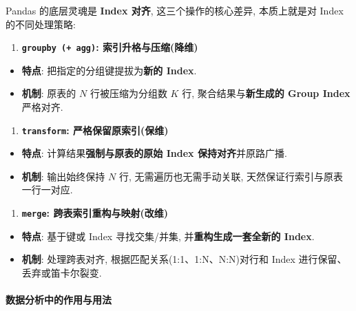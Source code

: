 \documentclass[11pt]{article}
\providecommand{\tightlist}{%
      \setlength{\itemsep}{0pt}\setlength{\parskip}{0pt}}
\begin{document}
    Pandas 的底层灵魂是 \textbf{Index 对齐}, 这三个操作的核心差异,
本质上就是对 Index 的不同处理策略:

\begin{enumerate}
\def\labelenumi{\arabic{enumi}.}
\tightlist
\item
  \textbf{\texttt{groupby\ (+\ agg)}: 索引升格与压缩(降维)}
\end{enumerate}

\begin{itemize}
\tightlist
\item
  \textbf{特点}: 把指定的分组键提拔为\textbf{新的 Index}.
\item
  \textbf{机制}: 原表的 \(N\) 行被压缩为分组数 \(K\) 行,
  聚合结果与\textbf{新生成的 Group Index} 严格对齐.
\end{itemize}

\begin{enumerate}
\def\labelenumi{\arabic{enumi}.}
\setcounter{enumi}{1}
\tightlist
\item
  \textbf{\texttt{transform}: 严格保留原索引(保维)}
\end{enumerate}

\begin{itemize}
\tightlist
\item
  \textbf{特点}: 计算结果\textbf{强制与原表的原始 Index
  保持对齐}并原路广播.
\item
  \textbf{机制}: 输出始终保持 \(N\) 行, 无需遍历也无需手动关联,
  天然保证行索引与原表一行一对应.
\end{itemize}

\begin{enumerate}
\def\labelenumi{\arabic{enumi}.}
\setcounter{enumi}{2}
\tightlist
\item
  \textbf{\texttt{merge}: 跨表索引重构与映射(改维)}
\end{enumerate}

\begin{itemize}
\tightlist
\item
  \textbf{特点}: 基于键或 Index 寻找交集/并集,
  并\textbf{重构生成一套全新的 Index}.
\item
  \textbf{机制}: 处理跨表对齐, 根据匹配关系(1:1、1:N、N:N)对行和 Index
  进行保留、丢弃或笛卡尔裂变.
\end{itemize}

    \paragraph{数据分析中的作用与用法}\label{ux6570ux636eux5206ux6790ux4e2dux7684ux4f5cux7528ux4e0eux7528ux6cd5}
\end{document}
